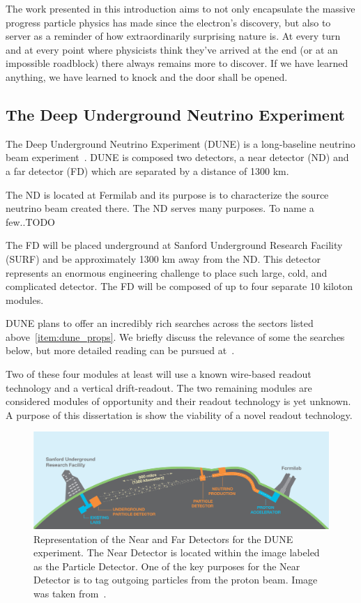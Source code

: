 The work presented in this introduction aims to not only encapsulate the massive progress particle physics has made since the electron's discovery, but also to server as a reminder of how extraordinarily surprising nature is.
At every turn and at every point where physicists think they've arrived at the end (or at an impossible roadblock) there always remains more to discover.
If we have learned anything, we have learned to knock and the door shall be opened.


\subsection{The Deep Underground Neutrino Experiment}

The Deep Underground Neutrino Experiment (DUNE) is a long-baseline neutrino beam experiment~\citep{DUNE_TDR_V1_Abi_2020, DUNE_FD_TDRv2_2020, DUNE_TDRv3_Abi_2020, DUNE-FD_TDRv4:Abi_2020}.
DUNE is composed two detectors, a near detector (ND) and a far detector (FD) which are separated by a distance of 1300 km.

The ND is located at Fermilab and its purpose is to characterize the source neutrino beam created there.
The ND serves many purposes.
To name a few..TODO

The FD will be placed underground at Sanford Underground Research Facility (SURF) and be approximately 1300 km away from the ND.
This detector represents an enormous engineering challenge to place such large, cold, and complicated detector.
The FD will be composed of up to four separate 10 kiloton modules.

DUNE plans to offer an incredibly rich searches across the sectors listed above~\ref{item:dune_props}.
We briefly discuss the relevance of some the searches below, but more detailed reading can be pursued at~\citep{DUNE_FD_TDRv2_2020}.

Two of these four modules at least will use a known wire-based readout technology and a vertical drift-readout.
The two remaining modules are considered modules of opportunity and their readout technology is yet unknown.
A purpose of this dissertation is show the viability of a novel readout technology.

\begin{figure}[]
\centering
\includegraphics[width=\textwidth]{images/LBNE_Graphic_061615_2016.jpg}
\caption{Representation of the Near and Far Detectors for the DUNE experiment. The Near Detector is located within the image labeled as the Particle Detector. One of the key purposes for the Near Detector is to tag outgoing particles from the proton beam. Image was taken from~\citep{dune_cdr_2016_arxiv}.}
\end{figure}

